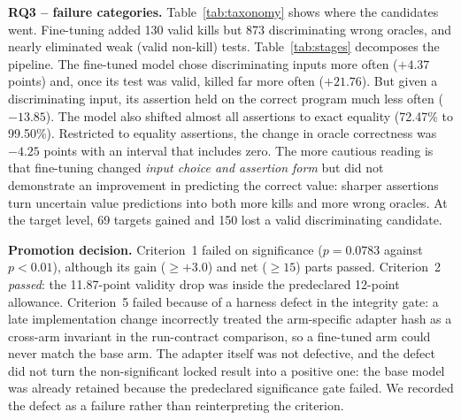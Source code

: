 \documentclass[10pt,conference,letterpaper]{IEEEtran}
\begin{document}
\textbf{RQ3 -- failure categories.} Table~\ref{tab:taxonomy} shows where the
candidates went. Fine-tuning added 130 valid kills but 873 discriminating wrong
oracles, and nearly eliminated weak (valid non-kill) tests. Table~\ref{tab:stages}
decomposes the pipeline. The fine-tuned model chose discriminating inputs more often
($+4.37$ points) and, once its test was valid, killed far more often ($+21.76$). But
given a discriminating input, its assertion held on the correct program much less
often ($-13.85$). The model also shifted almost all assertions to exact equality
(72.47\% to 99.50\%). Restricted to equality assertions, the change in oracle
correctness was $-4.25$ points with an interval that includes zero. The more cautious
reading is that fine-tuning changed \emph{input choice and assertion form} but did not
demonstrate an improvement in predicting the correct value: sharper assertions turn
uncertain value predictions into both more kills and more wrong oracles. At the target
level, 69 targets gained and 150 lost a valid discriminating candidate.

\textbf{Promotion decision.} Criterion~1 failed on significance ($p=0.0783$ against
$p<0.01$), although its gain ($\geq +3.0$) and net ($\geq 15$) parts passed. Criterion~2
\emph{passed}: the 11.87-point validity drop was inside the predeclared 12-point
allowance. Criterion~5 failed because of a harness defect in the integrity gate: a
late implementation change incorrectly treated the arm-specific adapter hash as a
cross-arm invariant in the run-contract comparison, so a fine-tuned arm could never
match the base arm. The adapter itself was not defective, and the defect did not turn
the non-significant locked result into a positive one: the base model was already
retained because the predeclared significance gate failed. We recorded the defect as a
failure rather than reinterpreting the criterion.
\end{document}

